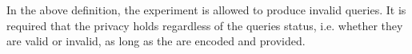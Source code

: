 In the above definition, the experiment is allowed to produce  invalid queries. It is required that  the privacy holds regardless of the queries status, i.e. whether they are valid or invalid, as long as the are encoded and provided.  
 
 
 
%
 
 
 
